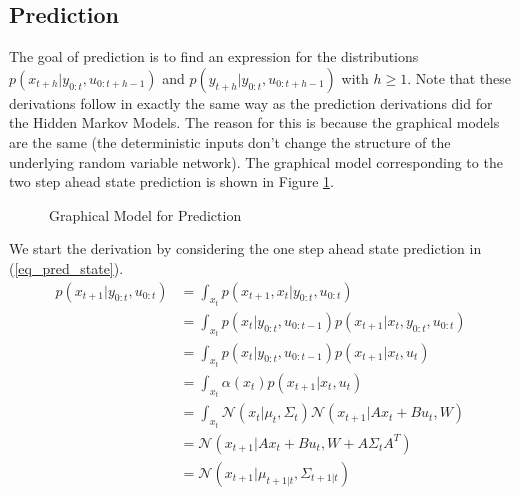 \subsection{Prediction}
\label{sec_lin_prediction}
The goal of prediction is to find an expression for the distributions $p(x_{t+h}|y_{0:t}, u_{0:t+h-1})$ and $p(y_{t+h}|y_{0:t}, u_{0:t+h-1})$ with $h\geq 1$. Note that these derivations follow in exactly the same way as the prediction derivations did for the Hidden Markov Models. The reason for this is because the graphical models are the same (the deterministic inputs don't change the structure of the underlying random variable network). The graphical model corresponding to  the two step ahead state prediction is shown in Figure \ref{fig_gm_linmods_prediction}.
\begin{figure}[H] 
\centering
{}
\caption{Graphical Model for Prediction}
\label{fig_gm_linmods_prediction}
\end{figure} 
We start the derivation by considering the one step ahead state prediction in (\ref{eq_pred_state}).
\begin{equation}
\begin{aligned}
p(x_{t+1}|y_{0:t}, u_{0:t}) &= \int_{x_t} p(x_{t+1},x_t|y_{0:t}, u_{0:t}) \\
&= \int_{x_t} p(x_t|y_{0:t}, u_{0:t-1}) p(x_{t+1}|x_t,y_{0:t}, u_{0:t}) \\
&= \int_{x_t} p(x_t|y_{0:t}, u_{0:t-1}) p(x_{t+1}|x_t, u_{t}) \\
&= \int_{x_t} \alpha(x_t) p(x_{t+1}|x_t, u_{t}) \\
&= \int_{x_t} \mathcal{N}(x_t|\mu_t, \Sigma_t) \mathcal{N}(x_{t+1}|Ax_t+Bu_t, W) \\
&= \mathcal{N}(x_{t+1}|Ax_t+Bu_t, W+A\Sigma_t A^T) \\
&= \mathcal{N}(x_{t+1}|\mu_{t+1|t}, \Sigma_{t+1|t})
\end{aligned}
\label{eq_pred_state}
\end{equation}
